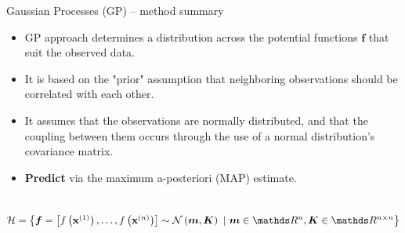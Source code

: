 
\begin{frame}{Gaussian Processes (GP) -- method summary}

   

\medskip

\begin{itemize}
  \item GP approach determines a distribution across the potential functions $\bm{f}$ that suit the observed data.
  \item It is based on the "prior" assumption that neighboring observations should be correlated with each other.
  \item It assumes that the observations are normally distributed, and that the coupling between them occurs through the use of a normal distribution's covariance matrix.
  \item \textbf{Predict} via the maximum a-posteriori (MAP) estimate.
\end{itemize}

\medskip

 ~~
$\Hspace = \left\{ \bm{f} = \left[f\left(\xi[1]\right), \dots, f\left(\xi[n]\right)\right] \sim \mathcal{N}\left(\bm{m}, \bm{K}\right) ~|~ \bm{m} \in \R^n, \bm{K} \in \R^{n\times n} \right\}$

\medskip


\end{frame}
